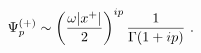 \begin{equation*}
\Psi _{p}^{(+)}\sim \left( \frac{\omega |x^{+}|}{2}\right) ^{ip}\frac{1}{%
\Gamma (1+ip)}\ .
\end{equation*}


